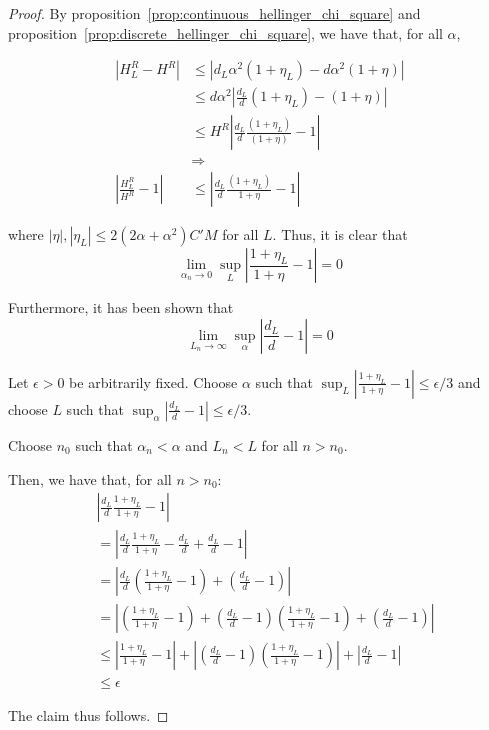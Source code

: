 \begin{proof}

By proposition~\ref{prop:continuous_hellinger_chi_square} and proposition~\ref{prop:discrete_hellinger_chi_square}, we have that, for all $\alpha$,

\begin{align*}
| H^R_L - H^R | 
 & \leq \left| d_L \alpha^2 ( 1 + \eta_L) - d \alpha^2 ( 1 + \eta) \right| \\
  &\leq d\alpha^2 \left| \frac{d_L}{d} (1 + \eta_L) - (1+\eta) \right|  \\
 &\leq H^R \left| \frac{d_L}{d} \frac{(1 + \eta_L)}{(1+\eta)} - 1 \right| \\
& \Rightarrow \\
\left| \frac{H^R_L}{H^R} - 1 \right| &\leq 
\left | \frac{d_L}{d} \frac{(1+\eta_L)}{1 + \eta} - 1 \right|
\end{align*}

where $|\eta|, |\eta_L| \leq 2(2\alpha + \alpha^2) C'M$ for all $L$. Thus, it is clear that 
\[
\lim_{\alpha_n \rightarrow 0} \sup_L \left| \frac{1+\eta_L}{1+\eta} - 1 \right| = 0
\]

Furthermore, it has been shown that
\[
\lim_{L_n \rightarrow \infty} \sup_\alpha \left| \frac{d_L}{d} - 1 \right| = 0
\]

Let $\epsilon > 0$ be arbitrarily fixed. 
Choose $\alpha$ such that $\sup_L \left| \frac{1+\eta_L}{1+\eta} - 1 \right| \leq \epsilon/3$ and choose $L$ such that $\sup_\alpha \left| \frac{d_L}{d} -1 \right| \leq \epsilon/3$. 

Choose $n_0$ such that $\alpha_n < \alpha$ and $L_n < L$ for all $n > n_0$. 

Then, we have that, for all $n > n_0$:
\begin{align*}
& \left| \frac{d_L}{d} \frac{1+\eta_L}{1+\eta} - 1 \right | \\
&= \left| \frac{d_L}{d} \frac{1 + \eta_L}{1 + \eta} - \frac{d_L}{d} + \frac{d_L}{d} - 1 \right| \\
&= \left| \frac{d_L}{d} \left( \frac{1+\eta_L}{1+\eta} - 1 \right) + \left( \frac{d_L}{d} - 1 \right) \right| \\
&= \left| \left( \frac{1+\eta_L}{1 + \eta} - 1 \right) + \left( \frac{d_L}{d} -1 \right) \left( \frac{1+\eta_L}{1+\eta} - 1 \right) + \left( \frac{d_L}{d} - 1 \right) \right| \\
&\leq  \left| \frac{1+\eta_L}{1 + \eta} - 1 \right| + \left| \left( \frac{d_L}{d} -1 \right) \left( \frac{1+\eta_L}{1+\eta} - 1 \right) \right| + \left| \frac{d_L}{d} - 1  \right| \\
&\leq \epsilon
\end{align*}

The claim thus follows. 

\end{proof}





